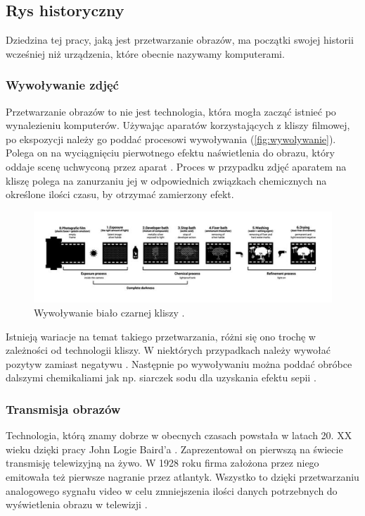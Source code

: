 \subsection{Rys historyczny}

Dziedzina tej pracy, jaką jest przetwarzanie obrazów, ma początki swojej historii wcześniej niż urządzenia, które obecnie nazywamy komputerami.

\subsubsection{Wywoływanie zdjęć}
Przetwarzanie obrazów to nie jest technologia, która mogła zacząć istnieć po wynalezieniu komputerów. Używając aparatów korzystających z kliszy filmowej, po ekspozycji należy go poddać procesowi wywoływania (\autoref{fig:wywolywanie}). 
Polega on na wyciągnięciu pierwotnego efektu naświetlenia do obrazu, który oddaje scenę uchwyconą przez aparat \cite{doi:https://doi.org/10.1002/14356007.a20_001}. Proces w przypadku zdjęć aparatem na kliszę polega na zanurzaniu jej w odpowiednich związkach chemicznych na określone ilości czasu, by otrzymać zamierzony efekt. 

\begin{figure}[H]
    \centering
    \includegraphics{./images/Picture1.jpg}
    \caption{Wywoływanie biało czarnej kliszy \cite{film}.}
    \label{fig:wywolywanie}
\end{figure}


Istnieją wariacje na temat takiego przetwarzania, różni się ono trochę w zależności od technologii kliszy. W niektórych przypadkach należy wywołać pozytyw zamiast negatywu \cite{almanac}. 
Następnie po wywoływaniu można poddać obróbce dalszymi chemikaliami jak np. siarczek sodu dla uzyskania efektu sepii \cite{sepia}. 

\subsubsection{Transmisja obrazów}
Technologia, którą znamy dobrze w obecnych czasach powstała w latach 20. XX wieku dzięki pracy John Logie Baird'a \cite{times1926}. 
Zaprezentował on pierwszą na świecie transmisję telewizyjną na żywo.
W 1928 roku \cite{bairdCompany} firma założona przez niego emitowała też pierwsze nagranie przez atlantyk. 
Wszystko to dzięki przetwarzaniu analogowego sygnału video w celu zmniejszenia ilości danych potrzebnych do wyświetlenia obrazu w telewizji \cite{analogVideo}.

